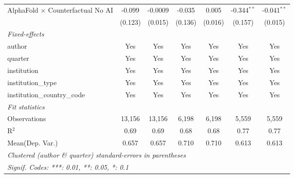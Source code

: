 \begin{tabular}{lcccccc}
   AlphaFold $\times$ Counterfactual No AI  & -0.099  & -0.0009 & -0.035  & 0.005   & -0.344$^{**}$ & -0.041$^{**}$\\   
                                            & (0.123) & (0.015) & (0.136) & (0.016) & (0.157)       & (0.015)\\   
   \midrule
   \emph{Fixed-effects}\\
   author                                   & Yes     & Yes     & Yes     & Yes     & Yes           & Yes\\  
   quarter                                  & Yes     & Yes     & Yes     & Yes     & Yes           & Yes\\  
   institution                              & Yes     & Yes     & Yes     & Yes     & Yes           & Yes\\  
   institution\_type                        & Yes     & Yes     & Yes     & Yes     & Yes           & Yes\\  
   institution\_country\_code               & Yes     & Yes     & Yes     & Yes     & Yes           & Yes\\  
   \midrule
   \emph{Fit statistics}\\
   Observations                             & 13,156  & 13,156  & 6,198   & 6,198   & 5,559         & 5,559\\  
   R$^2$                                    & 0.69    & 0.69    & 0.68    & 0.68    & 0.77          & 0.77\\  
Mean(Dep. Var.) & 0.657 & 0.657 & 0.710 & 0.710 & 0.613 & 0.613 \\
   \midrule \midrule
   \multicolumn{7}{l}{\emph{Clustered (author \& quarter) standard-errors in parentheses}}\\
   \multicolumn{7}{l}{\emph{Signif. Codes: ***: 0.01, **: 0.05, *: 0.1}}\\
\end{tabular}
\par\endgroup

